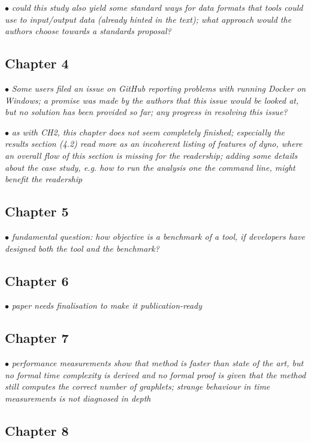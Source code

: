 \documentclass[10pt]{article}
\newcommand{\exam}[2][\  ]{\hspace{0pt}\marginpar{\color{red}#1}$\bullet$ \textit{#2}}
\newcommand{\imp}[1]{{\color{red} #1}}
\newcommand{\bigexclaim}{\raisebox{-0.1em}{\BigTriangleUp}\hspace{-0.32em}\llap{\small\textbf{!}}\hspace{0.32em}}
\newcommand{\tagimp}{\bigexclaim}
\begin{document}
{\exam{could this study also yield some standard ways for data formats that tools could use to input/output
	data (already hinted in the text); what approach would the authors choose towards a standards
	proposal?}

\subsection{Chapter 4}

\exam{Some users filed an issue on GitHub reporting problems with running Docker on Windows; a
	promise was made by the authors that this issue would be looked at, but no solution has been
	provided so far; any progress in resolving this issue?}

\exam{as with CH2, this chapter does not seem completely finished; especially the results section (4.2) read more as an incoherent listing of features of dyno, where an overall flow of this section is missing for the readership; adding some details about the case study, e.g. how to run the analysis one the command line, might benefit the readership}

\subsection{Chapter 5}

\exam[\tagimp]{fundamental question: \imp{how objective is a benchmark of a tool, if developers have designed both the tool and the benchmark?}}

\subsection{Chapter 6}

\exam{paper needs finalisation to make it publication-ready}

\subsection{Chapter 7}

\exam{performance measurements show that method is faster than state of the art, but no formal time complexity is derived and no formal proof is given that the method still computes the correct number of graphlets; strange behaviour in time measurements is not diagnosed in depth}

\subsection{Chapter 8}

}
\end{document}
